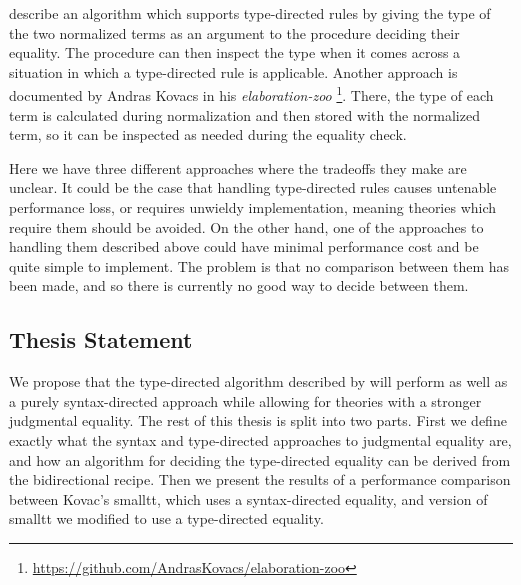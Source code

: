 \documentclass[sigplan]{acmart}
\begin{document}
\citet{Chapman2005} describe an algorithm which supports type-directed rules by giving the type of the two normalized terms as an argument to the procedure deciding their equality.
The procedure can then inspect the type when it comes across a situation in which a type-directed rule is applicable.
Another approach is documented by Andras Kovacs in his \textit{elaboration-zoo} \footnote{\url{https://github.com/AndrasKovacs/elaboration-zoo}}.
There, the type of each term is calculated during normalization and then stored with the normalized term, so it can be inspected as needed during the equality check.

Here we have three different approaches where the tradeoffs they make are unclear.
It could be the case that handling type-directed rules causes untenable performance loss, or requires unwieldy implementation, meaning theories which require them should be avoided.
On the other hand, one of the approaches to handling them described above could have minimal performance cost and be quite simple to implement.
The problem is that no comparison between them has been made, and so there is currently no good way to decide between them.

\subsection{Thesis Statement}
We propose that the type-directed algorithm described by \citet{Chapman2005} will perform as well as a purely syntax-directed approach while allowing for theories with a stronger judgmental equality.
The rest of this thesis is split into two parts.
First we define exactly what the syntax and type-directed approaches to judgmental equality are, and how an algorithm for deciding the type-directed equality can be derived from the bidirectional recipe.
Then we present the results of a performance comparison between Kovac's smalltt, which uses a syntax-directed equality, and version of smalltt we modified to use a type-directed equality.
\end{document}
